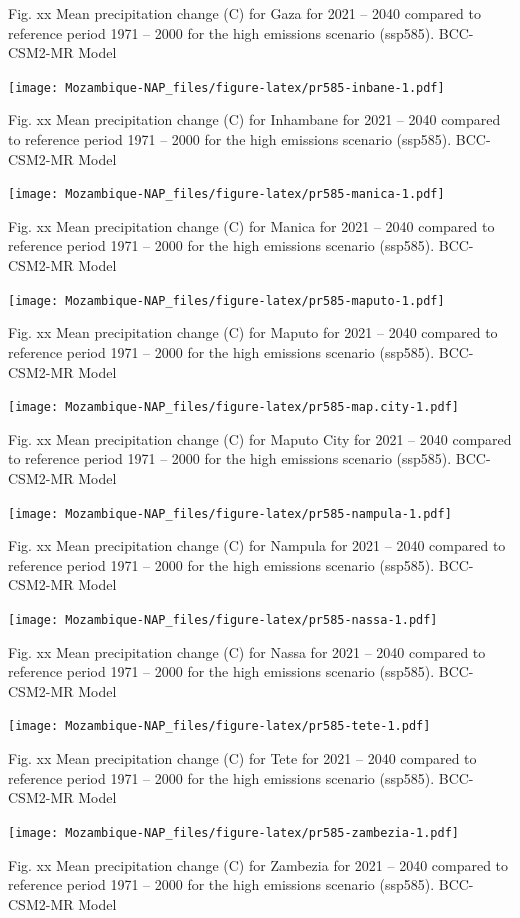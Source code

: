 \documentclass[
]{book}
\begin{document}
Fig. xx Mean precipitation change (C) for Gaza for 2021 -- 2040 compared to reference period 1971 -- 2000 for the high emissions scenario (ssp585). BCC-CSM2-MR Model

\texttt{[image: Mozambique-NAP\_files/figure-latex/pr585-inbane-1.pdf]}

Fig. xx Mean precipitation change (C) for Inhambane for 2021 -- 2040 compared to reference period 1971 -- 2000 for the high emissions scenario (ssp585). BCC-CSM2-MR Model

\texttt{[image: Mozambique-NAP\_files/figure-latex/pr585-manica-1.pdf]}

Fig. xx Mean precipitation change (C) for Manica for 2021 -- 2040 compared to reference period 1971 -- 2000 for the high emissions scenario (ssp585). BCC-CSM2-MR Model

\texttt{[image: Mozambique-NAP\_files/figure-latex/pr585-maputo-1.pdf]}

Fig. xx Mean precipitation change (C) for Maputo for 2021 -- 2040 compared to reference period 1971 -- 2000 for the high emissions scenario (ssp585). BCC-CSM2-MR Model

\texttt{[image: Mozambique-NAP\_files/figure-latex/pr585-map.city-1.pdf]}

Fig. xx Mean precipitation change (C) for Maputo City for 2021 -- 2040 compared to reference period 1971 -- 2000 for the high emissions scenario (ssp585). BCC-CSM2-MR Model

\texttt{[image: Mozambique-NAP\_files/figure-latex/pr585-nampula-1.pdf]}

Fig. xx Mean precipitation change (C) for Nampula for 2021 -- 2040 compared to reference period 1971 -- 2000 for the high emissions scenario (ssp585). BCC-CSM2-MR Model

\texttt{[image: Mozambique-NAP\_files/figure-latex/pr585-nassa-1.pdf]}

Fig. xx Mean precipitation change (C) for Nassa for 2021 -- 2040 compared to reference period 1971 -- 2000 for the high emissions scenario (ssp585). BCC-CSM2-MR Model

\texttt{[image: Mozambique-NAP\_files/figure-latex/pr585-tete-1.pdf]}

Fig. xx Mean precipitation change (C) for Tete for 2021 -- 2040 compared to reference period 1971 -- 2000 for the high emissions scenario (ssp585). BCC-CSM2-MR Model

\texttt{[image: Mozambique-NAP\_files/figure-latex/pr585-zambezia-1.pdf]}

Fig. xx Mean precipitation change (C) for Zambezia for 2021 -- 2040 compared to reference period 1971 -- 2000 for the high emissions scenario (ssp585). BCC-CSM2-MR Model
\end{document}
